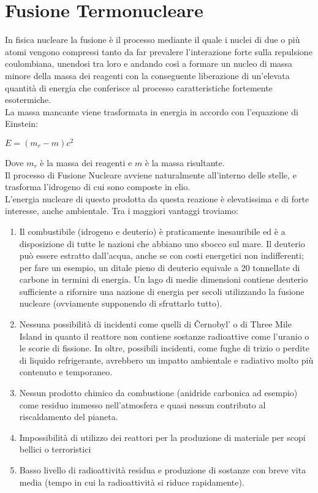 \section*{Fusione Termonucleare}
In fisica nucleare la fusione è il processo mediante il quale i nuclei di due o più atomi vengono compressi tanto da far prevalere l’interazione forte sulla repulsione coulombiana, unendosi tra loro e andando così a formare un nucleo di massa minore della massa dei reagenti con la conseguente liberazione di un’elevata quantità di energia che conferisce al processo caratteristiche fortemente esotermiche.\\
La massa mancante viene trasformata in energia in accordo con l’equazione di Einstein:
\begin{center}
	$E = (m_r - m)c^2$
\end{center}
Dove $ m_r $ è la massa dei reagenti e $ m $ è la massa risultante.\\
Il processo di Fusione Nucleare avviene naturalmente all'interno delle stelle, e trasforma l'idrogeno di cui sono composte in elio.\\
L'energia nucleare di questo prodotta da questa reazione è elevatissima e di forte interesse, anche ambientale. Tra i maggiori vantaggi troviamo:
\begin{enumerate}
	\item Il combustibile (idrogeno e deuterio) è praticamente inesauribile ed è a disposizione di tutte le nazioni che abbiano uno sbocco sul mare. Il deuterio può essere estratto dall'acqua, anche se con costi energetici non indifferenti; per fare un esempio, un ditale pieno di deuterio equivale a 20 tonnellate di carbone in termini di energia. Un lago di medie dimensioni contiene deuterio sufficiente a rifornire una nazione di energia per secoli utilizzando la fusione nucleare (ovviamente supponendo di sfruttarlo tutto).
	\item Nessuna possibilità di incidenti come quelli di Černobyl' o di Three Mile Island in quanto il reattore non contiene sostanze radioattive come l'uranio o le scorie di fissione. In oltre, possibili incidenti, come fughe di trizio o perdite di liquido refrigerante, avrebbero un impatto ambientale e radiativo molto più contenuto e temporaneo.
	\item Nessun prodotto chimico da combustione (anidride carbonica ad esempio) come residuo immesso nell'atmosfera e quasi nessun contributo al riscaldamento del pianeta.
	\item Impossibilità di utilizzo dei reattori per la produzione di materiale per scopi bellici o terroristici
	\item Basso livello di radioattività residua e produzione di sostanze con breve vita media (tempo in cui la radioattività si riduce rapidamente).
\end{enumerate}
